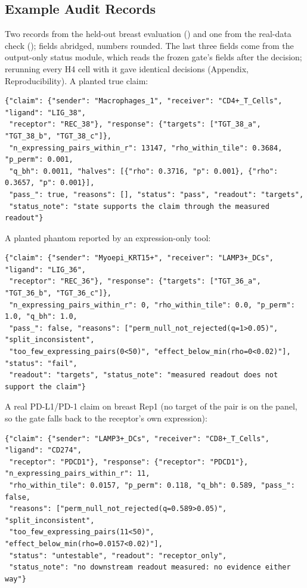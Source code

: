 \documentclass[letterpaper]{article} %
\begin{document}
\subsection{Example Audit Records}
Two records from the held-out breast evaluation (\repoAuditTrue) and one from the real-data check (\repoAuditReal);
fields abridged, numbers rounded. The last three fields come from the output-only status module, which reads the frozen
gate's fields after the decision; rerunning every H4 cell with it gave identical decisions (Appendix,
Reproducibility). A planted true claim:
{\scriptsize\begin{verbatim}
{"claim": {"sender": "Macrophages_1", "receiver": "CD4+_T_Cells", "ligand": "LIG_38",
 "receptor": "REC_38"}, "response": {"targets": ["TGT_38_a", "TGT_38_b", "TGT_38_c"]},
 "n_expressing_pairs_within_r": 13147, "rho_within_tile": 0.3684, "p_perm": 0.001,
 "q_bh": 0.0011, "halves": [{"rho": 0.3716, "p": 0.001}, {"rho": 0.3657, "p": 0.001}],
 "pass_": true, "reasons": [], "status": "pass", "readout": "targets",
 "status_note": "state supports the claim through the measured readout"}
\end{verbatim}}
\noindent A planted phantom reported by an expression-only tool:
{\scriptsize\begin{verbatim}
{"claim": {"sender": "Myoepi_KRT15+", "receiver": "LAMP3+_DCs", "ligand": "LIG_36",
 "receptor": "REC_36"}, "response": {"targets": ["TGT_36_a", "TGT_36_b", "TGT_36_c"]},
 "n_expressing_pairs_within_r": 0, "rho_within_tile": 0.0, "p_perm": 1.0, "q_bh": 1.0,
 "pass_": false, "reasons": ["perm_null_not_rejected(q=1>0.05)", "split_inconsistent",
 "too_few_expressing_pairs(0<50)", "effect_below_min(rho=0<0.02)"], "status": "fail",
 "readout": "targets", "status_note": "measured readout does not support the claim"}
\end{verbatim}}
\noindent A real PD-L1/PD-1 claim on breast Rep1 (no target of the pair is on the panel, so the gate falls back to the
receptor's own expression):
{\scriptsize\begin{verbatim}
{"claim": {"sender": "LAMP3+_DCs", "receiver": "CD8+_T_Cells", "ligand": "CD274",
 "receptor": "PDCD1"}, "response": {"receptor": "PDCD1"}, "n_expressing_pairs_within_r": 11,
 "rho_within_tile": 0.0157, "p_perm": 0.118, "q_bh": 0.589, "pass_": false,
 "reasons": ["perm_null_not_rejected(q=0.589>0.05)", "split_inconsistent",
 "too_few_expressing_pairs(11<50)", "effect_below_min(rho=0.0157<0.02)"],
 "status": "untestable", "readout": "receptor_only",
 "status_note": "no downstream readout measured: no evidence either way"}
\end{verbatim}}
\end{document}
